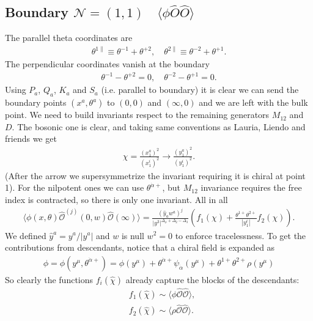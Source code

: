 \documentclass[letterpaper]{article}
\let\Oldsubsection\subsection
\renewcommand{\subsection}{\FloatBarrier\Oldsubsection}
\def\Nm{{\mathcal{N}}}
\def\Om{{\mathcal{O}}}
\def\ad{{\dot{\alpha}}}
\begin{document}
\subsection{Boundary \texorpdfstring{$\Nm=(1,1) \quad \langle \phi \hat O \hat O \rangle$}{} }

The parallel theta coordinates are
\begin{align}
\theta^{1\parallel} \equiv \theta^{-1} + \theta^{+2}, \quad
\theta^{2\parallel} \equiv \theta^{-2} + \theta^{+1}.
\end{align}
The perpendicular coordinates vanish at the boundary
\begin{align}
 \theta^{-1} - \theta^{+2} = 0, \quad
 \theta^{-2} - \theta^{+1} = 0.
\end{align}
Using $P_a$, $Q_a$, $K_a$ and $S_a$ (i.e. parallel to boundary) it is clear we can send the boundary points $(x^a, \theta^a)$ to $(0, 0)$ and $(\infty, 0)$ and we are left with the bulk point.
We need to build invariants respect to the remaining generators $M_{12}$ and $D$.
The bosonic one is clear, and taking same conventions as Lauria, Liendo and friends we get
\begin{align}
 \chi = \frac{(x_1^a)^2}{(x_1^i)^2} \to \frac{(y_1^a)^2}{(y_1^i)^2}.
\end{align}
(After the arrow we supersymmetrize the invariant requiring it is chiral at point 1).
For the nilpotent ones we can use $\theta^{\ad+}$, but $M_{12}$ invariance requires the free index is contracted, so there is only one invariant.
All in all
\begin{align}
\label{eq:corr-POJO}
 \langle \phi(x, \theta) \hat \Om^{(j)}(0, w) \hat \Om(\infty) \rangle
 = \frac{(\hat y_a w^a)^{j}}{|y^3|^{\Delta_\phi + \Delta_2 - \Delta_3}} \left(
   f_1(\chi)
   + \frac{\theta^{1+}\theta^{2+}}{|y_1^i|} f_2(\chi)
 \right).
\end{align}
We defined $\hat y^a = y^a / |y^a|$ and $w$ is null $w^2 = 0$ to enforce tracelessness.
To get the contributions from descendants, notice that a chiral field is expanded as
\begin{align}
 \phi 
 = \phi(y^\mu, \theta^{\ad+})
 = \phi(y^\mu)
 + \theta^{\ad+} \psi_{\ad}(y^\mu)
 + \theta^{1+} \theta^{2+} \rho(y^\mu)
\end{align}
So clearly the functions $f_i(\hat \chi)$ already capture the blocks of the descendants:
\begin{align}
\label{eq:map-structs}
 & f_1(\hat \chi) \sim \langle \phi \hat \Om \hat \Om \rangle, \\
 & f_2(\hat \chi) \sim \langle \rho \hat \Om \hat \Om \rangle.
\end{align}
\end{document}
